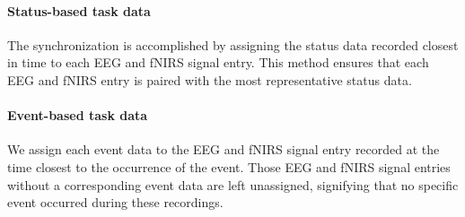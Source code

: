 \paragraph{Status-based task data} The synchronization is accomplished by
assigning the status data recorded closest in time to each EEG and fNIRS signal
entry. This method ensures that each EEG and fNIRS entry is paired with the
most representative status data.

\paragraph{Event-based task data} We assign each event data to the EEG and
fNIRS signal entry recorded at the time closest to the occurrence of the event.
Those EEG and fNIRS signal entries without a corresponding event data are left
unassigned, signifying that no specific event occurred during these recordings.
